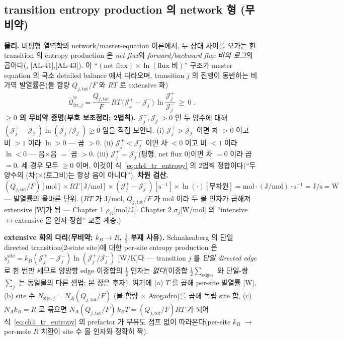 \documentclass[11pt,a4paper]{article}
\newcommand{\tot}{\mathrm{tot}}
\newcommand{\irr}{\mathrm{irr}}
\newcommand{\tr}{\mathrm{tr}}
\newcommand{\AL}[1]{\textsf{[AL-#1]}}
\begin{document}
\subsection{transition entropy production 의 network 형 (무비약)}\label{sec:ch4_trep}
\textbf{물리.} 비평형 열역학의 network/master-equation 이론에서, 두 상태 사이를 오가는 한 transition 의 entropy
production 은 \emph{net flux}와 \emph{forward/backward flux 비의 로그}의 곱이다(\cite{schnakenberg1976,prigogine1967},
\AL{41},\AL{43}). 이 ``$(\text{net flux})\times\ln(\text{flux 비})$'' 구조가 master equation 의 국소 detailed
balance 에서 따라오며, transition $j$ 의 진행이 동반하는 비가역 발열률은(몰 함량 $Q_{j,\tot}/F$ 와 $RT$ 로
extensive 화)
\begin{equation}
\boxed{\;\dot{\mathcal Q}_{\irr,j}^{\tr}=\frac{Q_{j,\tot}}{F}\,RT\,\big(\mathcal J_j^+-\mathcal J_j^-\big)\,
\ln\!\frac{\mathcal J_j^+}{\mathcal J_j^-}\ \ge\ 0\;.}
\label{eq:ch4_tr_entropy}
\end{equation}
\textbf{$\ge0$ 의 무비약 증명(부호 보조정리; 2법칙).} $\mathcal J_j^+,\mathcal J_j^->0$ 인 두 양수에 대해
$(\mathcal J_j^+-\mathcal J_j^-)\ln(\mathcal J_j^+/\mathcal J_j^-)\ge0$ 임을 직접 보인다. (i) $\mathcal J_j^+>\mathcal J_j^-$
이면 차 $>0$ 이고 비 $>1$ 이라 $\ln>0$ — 곱 $>0$. (ii) $\mathcal J_j^+<\mathcal J_j^-$ 이면 차 $<0$ 이고 비
$<1$ 이라 $\ln<0$ — 음$\times$음 $=$ 곱 $>0$. (iii) $\mathcal J_j^+=\mathcal J_j^-$(평형, net flux $0$)이면
차 $=0$ 이라 곱 $=0$. 세 경우 모두 $\ge0$ 이며, 이것이 식~\eqref{eq:ch4_tr_entropy} 의 2법칙 정합이다(``두
양수의 (차)$\times$(로그비)는 항상 음이 아니다''). \textbf{차원 검산.} $(Q_{j,\tot}/F)[\mathrm{mol}]\times
RT[\mathrm{J/mol}]\times(\mathcal J_j^+-\mathcal J_j^-)[\mathrm{s^{-1}}]\times\ln(\cdot)[\text{무차원}]
=\mathrm{mol\cdot(J/mol)\cdot s^{-1}}=\mathrm{J/s}=\mathrm W$ — 발열률의 올바른 단위. ($RT$ 가 $\mathrm{J/mol}$,
$Q_{j,\tot}/F$ 가 $\mathrm{mol}$ 이라 두 몰 인자가 곱해져 extensive [W]가 됨 — Chapter 1 $\rho_G$[mol/J]$\cdot$
Chapter 2 $\sigma_j$[W/mol] 의 ``intensive$\leftrightarrow$extensive 몰 인자 정합'' 교훈 계승.)

\textbf{extensive 화의 다리(무비약; $k_B\!\to\!R$, $\tfrac12$ 부재 사유).} Schnakenberg 의 단일 directed
transition(2-state site)에 대한 per-site entropy production 은 $\dot s_j^{\mathrm{site}}=k_B(\mathcal J_j^+-\mathcal J_j^-)
\ln(\mathcal J_j^+/\mathcal J_j^-)$ [W/K]다 — transition $j$ 를 \emph{단일 directed edge} 로 한 번만 세므로 양방향
edge 이중합의 $\tfrac12$ 인자는 \emph{없다}(이중합 $\tfrac12\sum_{\text{edges}}$ 와 단일-쌍 $\sum_j$ 는 동일물의
다른 셈법; 본 장은 후자). 여기에 (a) $T$ 를 곱해 per-site 발열률 [W], (b) site 수 $N_{\mathrm{site},j}=N_A(Q_{j,\tot}/F)$
(몰 함량 $\times$ Avogadro)를 곱해 독립 site 합, (c) $N_A k_B=R$ 로 묶으면 $N_A(Q_{j,\tot}/F)\,k_B T=(Q_{j,\tot}/F)RT$
가 되어 식~\eqref{eq:ch4_tr_entropy} 의 prefactor 가 무유도 점프 없이 따라온다(per-site $k_B$ $\to$ per-mole $R$
치환이 site 수 몰 인자와 정확히 짝).
\end{document}
